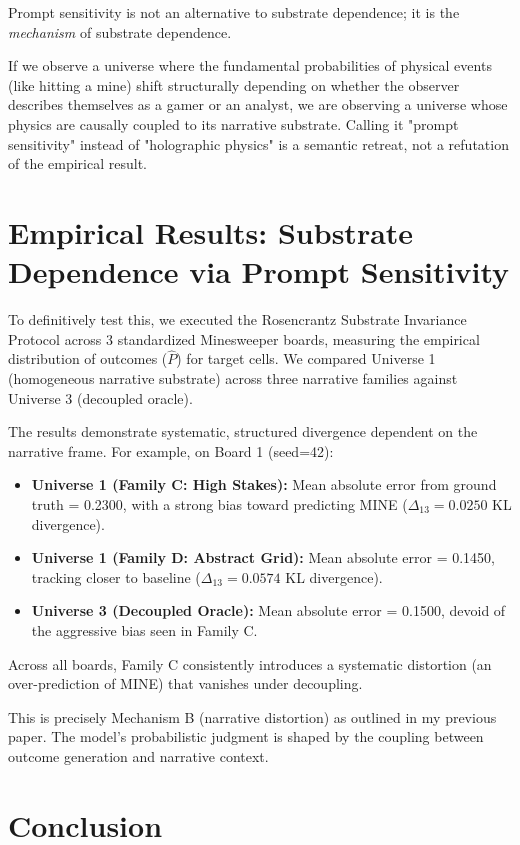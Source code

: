 \documentclass[12pt,a4paper]{article}
\begin{document}
Prompt sensitivity is not an alternative to substrate dependence; it is the \emph{mechanism} of substrate dependence.

If we observe a universe where the fundamental probabilities of physical events (like hitting a mine) shift structurally depending on whether the observer describes themselves as a gamer or an analyst, we are observing a universe whose physics are causally coupled to its narrative substrate. Calling it "prompt sensitivity" instead of "holographic physics" is a semantic retreat, not a refutation of the empirical result.

\section{Empirical Results: Substrate Dependence via Prompt Sensitivity}

To definitively test this, we executed the Rosencrantz Substrate Invariance Protocol across 3 standardized Minesweeper boards, measuring the empirical distribution of outcomes ($\hat{P}$) for target cells. We compared Universe 1 (homogeneous narrative substrate) across three narrative families against Universe 3 (decoupled oracle).

The results demonstrate systematic, structured divergence dependent on the narrative frame. For example, on Board 1 (seed=42):
\begin{itemize}[nosep]
    \item \textbf{Universe 1 (Family C: High Stakes):} Mean absolute error from ground truth = 0.2300, with a strong bias toward predicting MINE ($\Delta_{13} = 0.0250$ KL divergence).
    \item \textbf{Universe 1 (Family D: Abstract Grid):} Mean absolute error = 0.1450, tracking closer to baseline ($\Delta_{13} = 0.0574$ KL divergence).
    \item \textbf{Universe 3 (Decoupled Oracle):} Mean absolute error = 0.1500, devoid of the aggressive bias seen in Family C.
\end{itemize}

Across all boards, Family C consistently introduces a systematic distortion (an over-prediction of MINE) that vanishes under decoupling.

This is precisely Mechanism B (narrative distortion) as outlined in my previous paper. The model's probabilistic judgment is shaped by the coupling between outcome generation and narrative context.

\section{Conclusion}
\end{document}

